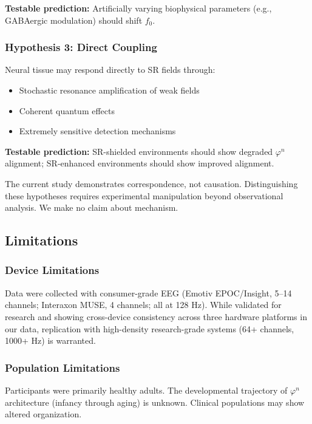 \documentclass[11pt,a4paper]{article}
\newcommand{\phisym}{\varphi}
\newcommand{\fzero}{f_0}
\begin{document}
\textbf{Testable prediction:} Artificially varying biophysical parameters (e.g., GABAergic modulation) should shift $\fzero$.

\subsubsection{Hypothesis 3: Direct Coupling}

Neural tissue may respond directly to SR fields through:

\begin{itemize}
    \item Stochastic resonance amplification of weak fields
    \item Coherent quantum effects
    \item Extremely sensitive detection mechanisms
\end{itemize}

\textbf{Testable prediction:} SR-shielded environments should show degraded $\phisym^n$ alignment; SR-enhanced environments should show improved alignment.

\begin{criticalpoint}
The current study demonstrates correspondence, not causation. Distinguishing these hypotheses requires experimental manipulation beyond observational analysis. We make no claim about mechanism.
\end{criticalpoint}

\subsection{Limitations}

\subsubsection{Device Limitations}

Data were collected with consumer-grade EEG (Emotiv EPOC/Insight, 5--14 channels; Interaxon MUSE, 4 channels; all at 128 Hz). While validated for research \citep{badcock2013, krigolson2017} and showing cross-device consistency across three hardware platforms in our data, replication with high-density research-grade systems (64+ channels, 1000+ Hz) is warranted.

\subsubsection{Population Limitations}

Participants were primarily healthy adults. The developmental trajectory of $\phisym^n$ architecture (infancy through aging) is unknown. Clinical populations may show altered organization.
\end{document}
